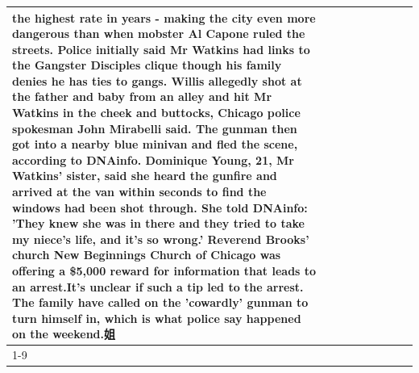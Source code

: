 \begin{table}[H]
\begin{tabular}{lllrlllll}
the highest rate in years - making the city even more dangerous than when mobster Al Capone ruled the streets. Police initially said Mr Watkins had links to the Gangster Disciples clique though his family denies he has ties to gangs. Willis allegedly shot at the father and baby from an alley and hit Mr Watkins in the cheek and buttocks, Chicago police spokesman John Mirabelli said. The gunman then got into a nearby blue minivan and fled the scene, according to DNAinfo. Dominique Young, 21, Mr Watkins' sister, said she heard the gunfire and arrived at the van within seconds to find the windows had been shot through. She told DNAinfo: 'They knew she was in there and they tried to take my niece's life, and it's so wrong.' Reverend Brooks' church New Beginnings Church of Chicago was offering a \$5,000 reward for information that leads to an arrest.It's unclear if such a tip led to the arrest. The family have called on the 'cowardly' gunman to turn himself in, which is what police say happened on the weekend.姐 \\
\cline{1-9}

\end{tabular}
\end{table}
